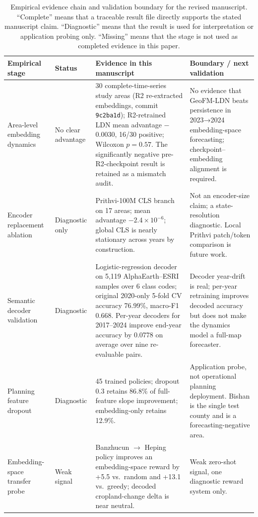 \documentclass{article}
\begin{document}
\begin{table}[htbp]
\centering
\caption{Empirical evidence chain and validation boundary for the revised manuscript. ``Complete'' means that a traceable result file directly supports the stated manuscript claim. ``Diagnostic'' means that the result is used for interpretation or application probing only. ``Missing'' means that the stage is not used as completed evidence in this paper.}
\label{tab:empirical_pipeline}
\footnotesize
\setlength{\tabcolsep}{2pt}
\begin{tabular}{@{}P{0.20\textwidth}P{0.11\textwidth}P{0.37\textwidth}P{0.26\textwidth}@{}}
\toprule
Empirical stage & Status & Evidence in this manuscript & Boundary / next validation \\
\midrule
Area-level embedding dynamics & No clear advantage & 30 complete-time-series study areas (R2 re-extracted embeddings, commit \texttt{9c2ba1d}); R2-retrained LDN mean advantage $-$0.0030, 16/30 positive; Wilcoxon $p=0.57$. The significantly negative pre-R2-checkpoint result is retained as a mismatch audit. & No evidence that GeoFM-LDN beats persistence in 2023→2024 embedding-space forecasting; checkpoint--embedding alignment is required. \\
Encoder replacement ablation & Diagnostic only & Prithvi-100M CLS branch on 17 areas; mean advantage $-2.4\times 10^{-6}$; global CLS is nearly stationary across years by construction. & Not an encoder-size claim; a state-resolution diagnostic. Local Prithvi patch/token comparison is future work. \\
Semantic decoder validation & Diagnostic & Logistic-regression decoder on 5,119 AlphaEarth--ESRI samples over 6 class codes; original 2020-only 5-fold CV accuracy 76.99\%, macro-F1 0.668. Per-year decoders for 2017--2024 improve end-year accuracy by 0.0778 on average over nine re-evaluable pairs. & Decoder year-drift is real; per-year retraining improves decoded accuracy but does not make the dynamics model a full-map forecaster. \\
Planning feature dropout & Diagnostic & 45 trained policies; dropout 0.3 retains 86.8\% of full-feature slope improvement; embedding-only retains 12.9\%. & Application probe, not operational planning deployment. Bishan is the single test county and is a forecasting-negative area. \\
Embedding-space transfer probe & Weak signal & Banzhucun $\to$ Heping policy improves an embedding-space reward by +5.5 vs.\ random and +13.1 vs.\ greedy; decoded cropland-change delta is near neutral. & Weak zero-shot signal, one diagnostic reward system only. \\

\end{tabular}
\end{table}
\end{document}
